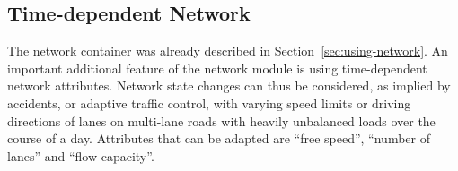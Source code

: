 


\subsection{Time-dependent Network}
\label{sec:extending-network}

The network container was already described in Section~\ref{sec:using-network}.
%
An important additional feature of the network module is using time-dependent network attributes. Network state changes can thus be considered, as \eg implied by accidents, or adaptive traffic control, with varying speed limits or driving directions of lanes on multi-lane roads with heavily unbalanced loads over the course of a day. Attributes that can be adapted are ``free speed'', ``number of lanes'' and ``flow capacity''.


